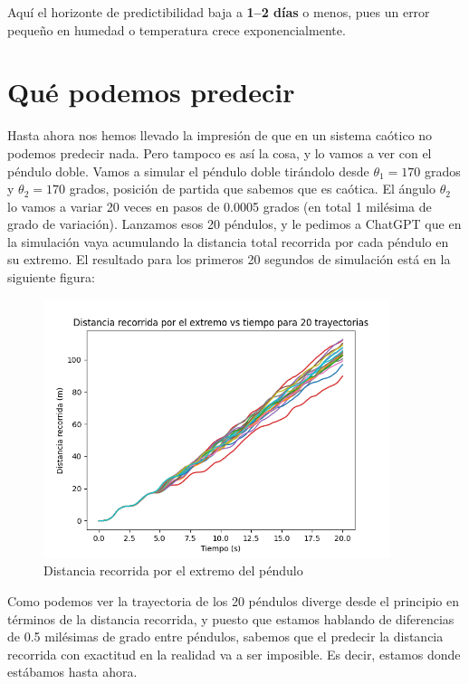 \documentclass[
  10pt,
  a4paper,
  DIV=11,
  numbers=noendperiod,
  open=any]{scrreprt}
\numberwithin{equation}{chapter}
\numberwithin{equation}{section}
\renewcommand{\[}{\begin{equation}}
\renewcommand{\]}{\end{equation}}
\begin{document}
Aquí el horizonte de predictibilidad baja a \textbf{1--2 días} o menos,
pues un error pequeño en humedad o temperatura crece exponencialmente.

\chapter{Qué podemos predecir}\label{quuxe9-podemos-predecir}

Hasta ahora nos hemos llevado la impresión de que en un sistema caótico
no podemos predecir nada. Pero tampoco es así la cosa, y lo vamos a ver
con el péndulo doble. Vamos a simular el péndulo doble tirándolo desde
\(\theta_1=170\) grados y \(\theta_2=170\) grados, posición de partida
que sabemos que es caótica. El ángulo \(\theta_2\) lo vamos a variar 20
veces en pasos de 0.0005 grados (en total 1 milésima de grado de
variación). Lanzamos esos 20 péndulos, y le pedimos a ChatGPT que en la
simulación vaya acumulando la distancia total recorrida por cada péndulo
en su extremo. El resultado para los primeros 20 segundos de simulación
está en la siguiente figura:

\begin{figure}[h]
  \centering
  \includegraphics[width=0.9\textwidth]{02-pendulo-doble/Distancia20.png}
  \caption{Distancia recorrida por el extremo del péndulo}
\end{figure}


Como podemos ver la trayectoria de los 20 péndulos diverge desde el
principio en términos de la distancia recorrida, y puesto que estamos
hablando de diferencias de 0.5 milésimas de grado entre péndulos,
sabemos que el predecir la distancia recorrida con exactitud en la
realidad va a ser imposible. Es decir, estamos donde estábamos hasta
ahora.
\end{document}
